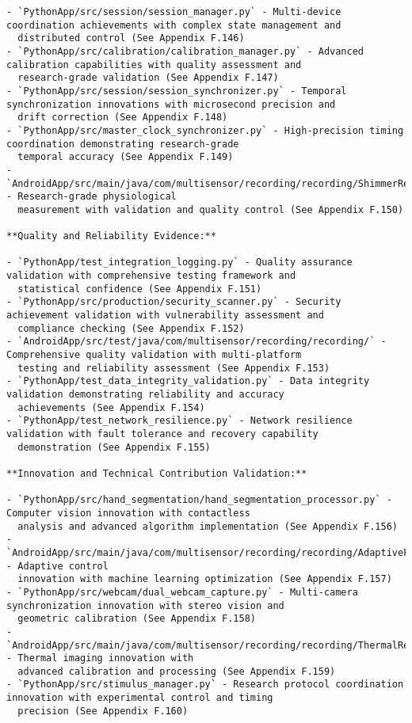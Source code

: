 \documentclass[12pt,a4paper]{report}
\begin{document}
\begin{verbatim}
- `PythonApp/src/session/session_manager.py` - Multi-device coordination achievements with complex state management and
  distributed control (See Appendix F.146)
- `PythonApp/src/calibration/calibration_manager.py` - Advanced calibration capabilities with quality assessment and
  research-grade validation (See Appendix F.147)
- `PythonApp/src/session/session_synchronizer.py` - Temporal synchronization innovations with microsecond precision and
  drift correction (See Appendix F.148)
- `PythonApp/src/master_clock_synchronizer.py` - High-precision timing coordination demonstrating research-grade
  temporal accuracy (See Appendix F.149)
- `AndroidApp/src/main/java/com/multisensor/recording/recording/ShimmerRecorder.kt` - Research-grade physiological
  measurement with validation and quality control (See Appendix F.150)

**Quality and Reliability Evidence:**

- `PythonApp/test_integration_logging.py` - Quality assurance validation with comprehensive testing framework and
  statistical confidence (See Appendix F.151)
- `PythonApp/src/production/security_scanner.py` - Security achievement validation with vulnerability assessment and
  compliance checking (See Appendix F.152)
- `AndroidApp/src/test/java/com/multisensor/recording/recording/` - Comprehensive quality validation with multi-platform
  testing and reliability assessment (See Appendix F.153)
- `PythonApp/test_data_integrity_validation.py` - Data integrity validation demonstrating reliability and accuracy
  achievements (See Appendix F.154)
- `PythonApp/test_network_resilience.py` - Network resilience validation with fault tolerance and recovery capability
  demonstration (See Appendix F.155)

**Innovation and Technical Contribution Validation:**

- `PythonApp/src/hand_segmentation/hand_segmentation_processor.py` - Computer vision innovation with contactless
  analysis and advanced algorithm implementation (See Appendix F.156)
- `AndroidApp/src/main/java/com/multisensor/recording/recording/AdaptiveFrameRateController.kt` - Adaptive control
  innovation with machine learning optimization (See Appendix F.157)
- `PythonApp/src/webcam/dual_webcam_capture.py` - Multi-camera synchronization innovation with stereo vision and
  geometric calibration (See Appendix F.158)
- `AndroidApp/src/main/java/com/multisensor/recording/recording/ThermalRecorder.kt` - Thermal imaging innovation with
  advanced calibration and processing (See Appendix F.159)
- `PythonApp/src/stimulus_manager.py` - Research protocol coordination innovation with experimental control and timing
  precision (See Appendix F.160)


\end{verbatim}
\end{document}
